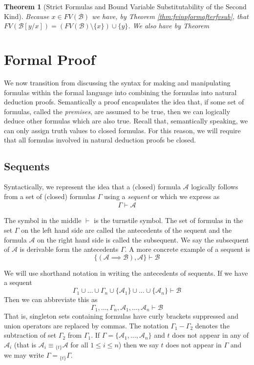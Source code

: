 \documentclass[12pt]{article}
\theoremstyle{break}
\theoremstyle{break}
\newtheorem{theorem}{Theorem}[section]
\theoremstyle{break}
\theoremstyle{break}
\theoremstyle{break}
\newtheorem{informal definition}[definition]{Informal Definition}
\newcommand{\mc}[1]{\mathcal{#1}}
\begin{document}
\begin{theorem}[Strict Formulas and Bound Variable Substitutability of the Second Kind]
Because $x\in FV(\mc{B})$ we have, by Theorem \ref{thm:fvinpformafterfvsub}, that $FV(\mc{B}[y/x]) = (FV(\mc{B})\setminus \{x\}) \cup \{y\}$.
We also have by Theorem
\end{theorem}


\section{Formal Proof}

We now transition from discussing the syntax for making and manipulating formulas within the formal language into combining the formulas into natural deduction proofs.
Semantically a proof encapsulates the idea that, if some set of formulas, called the \textit{premises}, are assumed to be true, then we can logically deduce other formulas which are also true.
Recall that, semantically speaking, we can only assign truth values to closed formulas.
For this reason, we will require that all formulas involved in natural deduction proofs be closed.

\subsection{Sequents}

Syntactically, we represent the idea that a (closed) formula $\mc{A}$ logically follows from a set of (closed) formulas $\Gamma$ using a \textit{sequent} or  which we express as
\begin{align}
\Gamma \vdash \mc{A}
\end{align}

The symbol in the middle $\vdash$ is the turnstile symbol.
The set of formulas in the set $\Gamma$ on the left hand side are called the antecedents of the sequent and the formula $\mc{A}$ on the right hand side is called the subsequent.
We say the subsequent of $\mc{A}$ is derivable form the antecedents $\Gamma$.
A more concrete example of a sequent is
$$
\{(\mc{A}\implies \mc{B}), \mc{A}\} \vdash \mc{B}
$$

We will use shorthand notation in writing the antecedents of sequents.
If we have a sequent
$$
\Gamma_1\cup \ldots \cup \Gamma_n \cup \{\mc{A}_1\}\cup \ldots \cup \{\mc{A}_n\} \vdash \mc{B}
$$
Then we can abbreviate this as
$$
\Gamma_1,\ldots, \Gamma_n, \mc{A}_1,\ldots, \mc{A}_n \vdash \mc{B}
$$
That is, singleton sets containing formulas have curly brackets suppressed and union operators are replaced by commas.
The notation $\Gamma_1 - \Gamma_2$ denotes the subtraction of set $\Gamma_2$ from $\Gamma_1$.
If $\Gamma = \{\mc{A}_1, \ldots, \mc{A}_n\}$ and $t$ does not appear in any of $\mc{A}_i$ (that is $\mc{A}_i \equiv {_{\{t\}}\mc{A}}$ for all $1\le i \le n$) then we say $t$ does not appear in $\Gamma$ and we may write $\Gamma = {_{\{t\}}\Gamma}$.
\end{document}
